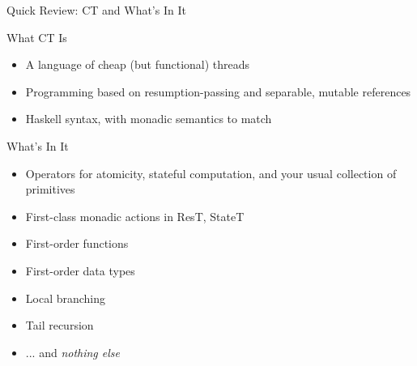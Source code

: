 \documentclass{beamer}
\begin{document}
\begin{frame}{Quick Review: CT and What's In It}


\begin{structure}{What CT Is}

\begin{onlinebox}{10cm}
\begin{itemize}

\item{A language of cheap (but functional) threads}

\item{Programming based on resumption-passing and separable, mutable references}

\item{Haskell syntax, with monadic semantics to match}

\end{itemize}
\end{onlinebox}
\end{structure}

\bigskip

\begin{structure}{What's In It}

\begin{onlinebox}{10cm}
\begin{itemize}

\item{Operators for atomicity, stateful computation, and your usual collection of primitives}

\item{First-class monadic actions in ResT, StateT}

\item{First-order functions}

\item{First-order data types}

\item{Local branching}

\item{Tail recursion}

\item{... and \emph{nothing else}}

\end{itemize}
\end{onlinebox}
\end{structure}

\end{frame}
\end{document}
